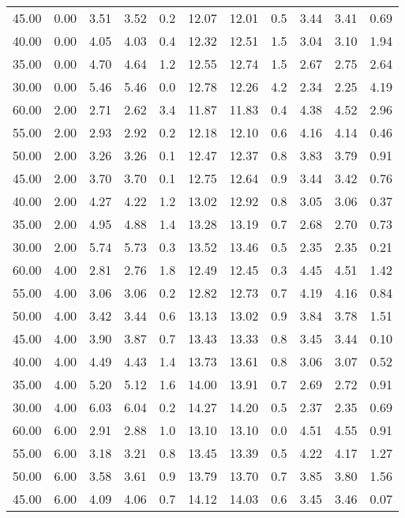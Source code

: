 \documentclass[english]{SPFShortReport}
\begin{document}
\begin{table}[!ht]
\begin{adjustbox}{max width =\textwidth}
\begin{tabular}{l | c c c c c c c c c c }
45.00  & 0.00 & 3.51 & 3.52 & 0.2 & 12.07 & 12.01 & 0.5 & 3.44 & 3.41 & 0.69\\ 
40.00  & 0.00 & 4.05 & 4.03 & 0.4 & 12.32 & 12.51 & 1.5 & 3.04 & 3.10 & 1.94\\ 
35.00  & 0.00 & 4.70 & 4.64 & 1.2 & 12.55 & 12.74 & 1.5 & 2.67 & 2.75 & 2.64\\ 
30.00  & 0.00 & 5.46 & 5.46 & 0.0 & 12.78 & 12.26 & 4.2 & 2.34 & 2.25 & 4.19\\ 
60.00  & 2.00 & 2.71 & 2.62 & 3.4 & 11.87 & 11.83 & 0.4 & 4.38 & 4.52 & 2.96\\ 
55.00  & 2.00 & 2.93 & 2.92 & 0.2 & 12.18 & 12.10 & 0.6 & 4.16 & 4.14 & 0.46\\ 
50.00  & 2.00 & 3.26 & 3.26 & 0.1 & 12.47 & 12.37 & 0.8 & 3.83 & 3.79 & 0.91\\ 
45.00  & 2.00 & 3.70 & 3.70 & 0.1 & 12.75 & 12.64 & 0.9 & 3.44 & 3.42 & 0.76\\ 
40.00  & 2.00 & 4.27 & 4.22 & 1.2 & 13.02 & 12.92 & 0.8 & 3.05 & 3.06 & 0.37\\ 
35.00  & 2.00 & 4.95 & 4.88 & 1.4 & 13.28 & 13.19 & 0.7 & 2.68 & 2.70 & 0.73\\ 
30.00  & 2.00 & 5.74 & 5.73 & 0.3 & 13.52 & 13.46 & 0.5 & 2.35 & 2.35 & 0.21\\ 
60.00  & 4.00 & 2.81 & 2.76 & 1.8 & 12.49 & 12.45 & 0.3 & 4.45 & 4.51 & 1.42\\ 
55.00  & 4.00 & 3.06 & 3.06 & 0.2 & 12.82 & 12.73 & 0.7 & 4.19 & 4.16 & 0.84\\ 
50.00  & 4.00 & 3.42 & 3.44 & 0.6 & 13.13 & 13.02 & 0.9 & 3.84 & 3.78 & 1.51\\ 
45.00  & 4.00 & 3.90 & 3.87 & 0.7 & 13.43 & 13.33 & 0.8 & 3.45 & 3.44 & 0.10\\ 
40.00  & 4.00 & 4.49 & 4.43 & 1.4 & 13.73 & 13.61 & 0.8 & 3.06 & 3.07 & 0.52\\ 
35.00  & 4.00 & 5.20 & 5.12 & 1.6 & 14.00 & 13.91 & 0.7 & 2.69 & 2.72 & 0.91\\ 
30.00  & 4.00 & 6.03 & 6.04 & 0.2 & 14.27 & 14.20 & 0.5 & 2.37 & 2.35 & 0.69\\ 
60.00  & 6.00 & 2.91 & 2.88 & 1.0 & 13.10 & 13.10 & 0.0 & 4.51 & 4.55 & 0.91\\ 
55.00  & 6.00 & 3.18 & 3.21 & 0.8 & 13.45 & 13.39 & 0.5 & 4.22 & 4.17 & 1.27\\ 
50.00  & 6.00 & 3.58 & 3.61 & 0.9 & 13.79 & 13.70 & 0.7 & 3.85 & 3.80 & 1.56\\ 
45.00  & 6.00 & 4.09 & 4.06 & 0.7 & 14.12 & 14.03 & 0.6 & 3.45 & 3.46 & 0.07\\ 

\end{tabular}
\end{adjustbox}
\end{table}
\end{document}
